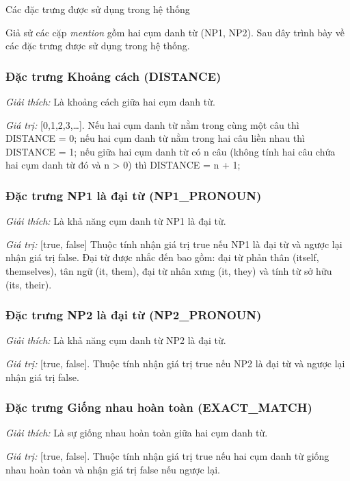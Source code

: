\documentclass[12pt]{report}
\begin{document}
				\begin{table}[H]
					\centering
					
					\caption{Các đặc trưng được sử dụng trong hệ thống}
					\label{features_table}
				\end{table}

				\par Giả sử các cặp \textit{mention} gồm hai cụm danh từ (NP1, NP2). Sau đây trình bày về các đặc trưng được sử dụng trong hệ thống.

				\subsubsection*{Đặc trưng Khoảng cách (DISTANCE)}
					\par \textit{Giải thích:} Là khoảng cách giữa hai cụm danh từ.
					\par \textit{Giá trị:} [0,1,2,3,…]. Nếu hai cụm danh từ nằm trong cùng một câu thì DISTANCE = 0; nếu hai cụm danh từ nằm trong hai câu liền nhau thì DISTANCE = 1; nếu giữa hai cụm danh từ có n câu (không tính hai câu chứa hai cụm danh từ đó và n > 0) thì DISTANCE = n + 1;
	 
				\subsubsection*{Đặc trưng NP1 là đại từ (NP1\_PRONOUN)}
					\par \textit{Giải thích:} Là khả năng cụm danh từ NP1 là đại từ.
					\par \textit{Giá trị:} [true, false] Thuộc tính nhận giá trị true nếu NP1 là đại từ và ngược lại nhận giá trị false. Đại từ được nhắc đến bao gồm: đại từ phản thân (itself, themselves), tân ngữ (it, them), đại từ nhân xưng (it, they) và tính từ sở hữu (its, their).

				\subsubsection*{Đặc trưng NP2 là đại từ (NP2\_PRONOUN)}
					\par \textit{Giải thích:} Là khả năng cụm danh từ NP2 là đại từ.
					\par \textit{Giá trị:} [true, false]. Thuộc tính nhận giá trị true nếu NP2 là đại từ và ngược lại nhận giá trị false.

				\subsubsection*{Đặc trưng Giống nhau hoàn toàn (EXACT\_MATCH)}
					\par \textit{Giải thích:} Là sự giống nhau hoàn toàn giữa hai cụm danh từ.
					\par \textit{Giá trị:} [true, false]. Thuộc tính nhận giá trị true nếu hai cụm danh từ giống nhau hoàn toàn và nhận giá trị false nếu ngược lại.
\end{document}
